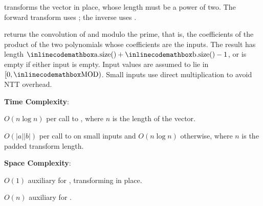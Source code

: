 \begin{compactitem}
  \item {} transforms the vector  in place, whose length must be a power of two. The forward transform uses ; the inverse uses .
  \item {} returns the convolution of  and  modulo the prime, that is, the coefficients of the product of the two polynomials whose coefficients are the inputs. The result has length ${\inlinecodemath{a.size()}} + {\inlinecodemath{b.size()}} - 1$, or is empty if either input is empty. Input values are assumed to lie in $[0, {\inlinecodemath{MOD}})$. Small inputs use direct multiplication to avoid NTT overhead.
\end{compactitem}

\textbf{Time Complexity}:
\begin{compactitem}
  \item $O(n \log n)$ per call to , where $n$ is the length of the vector.
  \item $O(|a||b|)$ per call to  on small inputs and $O(n \log n)$ otherwise, where $n$ is the padded transform length.
\end{compactitem}

\textbf{Space Complexity}:
\begin{compactitem}
  \item $O(1)$ auxiliary for , transforming in place.
  \item $O(n)$ auxiliary for .
\end{compactitem}

